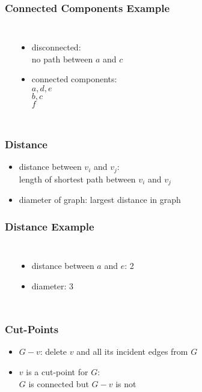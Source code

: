 \documentclass[dvipsnames]{beamer}
\begin{document}
\begin{frame}
  \frametitle{Connected Components Example}

  \begin{columns}
    \begin{center}
    \end{center}

    \begin{itemize}
      \item disconnected:\\
        no path between $a$ and $c$
      \item connected components:\\
        $a,d,e$\\
        $b,c$\\
        $f$
    \end{itemize}
  \end{columns}
\end{frame}

\begin{frame}
  \frametitle{Distance}

  \begin{itemize}
    \item \alert{distance} between $v_i$ and $v_j$:\\
      length of shortest path between $v_i$ and $v_j$
    \item \alert{diameter} of graph: largest distance in graph
  \end{itemize}
\end{frame}

\begin{frame}
  \frametitle{Distance Example}

  \begin{columns}
    \begin{center}
    \end{center}

    \begin{itemize}
      \item distance between $a$ and $e$: 2\\
      \item diameter: 3
    \end{itemize}
  \end{columns}
\end{frame}

\begin{frame}
  \frametitle{Cut-Points}

  \begin{itemize}
    \item \alert{$G - v$}: delete $v$ and all its incident edges from $G$

    \item $v$ is a \alert{cut-point} for $G$:\\
      $G$ is connected but $G - v$ is not
  \end{itemize}
\end{frame}
\end{document}
